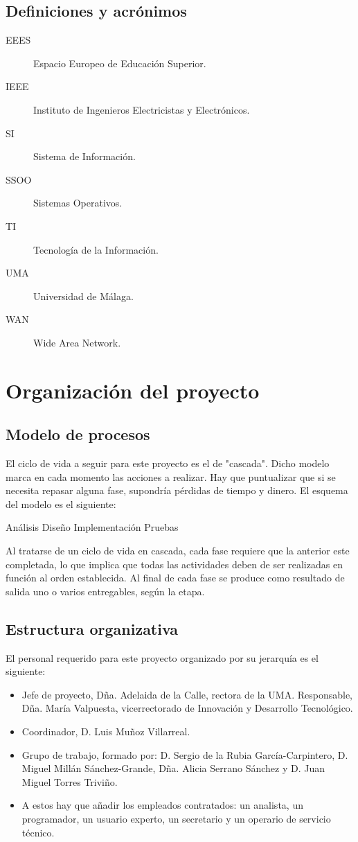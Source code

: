 \documentclass[11pt,a4paper,spanish,twoside]{report}
\begin{document}
\section{Definiciones y acrónimos}
\begin{description}
\item[EEES] Espacio Europeo de Educación Superior.
\item[IEEE] Instituto de Ingenieros Electricistas y Electrónicos.
\item[SI] Sistema de Información.
\item[SSOO] Sistemas Operativos.
\item[TI] Tecnología de la Información.
\item[UMA] Universidad de Málaga.
\item[WAN] Wide Area Network.
\end{description}

\chapter{Organización del proyecto}
\section{Modelo de procesos}
El ciclo de vida a seguir para este proyecto es el de "cascada". Dicho 
modelo marca en cada momento las acciones a realizar. Hay que puntualizar 
que si se necesita repasar alguna fase, supondría pérdidas de tiempo y dinero.
El esquema del modelo es el siguiente:

Análisis
    Diseño
        Implementación
            Pruebas

Al tratarse de un ciclo de vida en cascada, cada fase requiere que la anterior 
este completada, lo que implica que todas las actividades deben de ser 
realizadas en función al orden establecida. Al final de cada fase se produce 
como resultado de salida uno o varios entregables, según la etapa.

\section{Estructura organizativa}
El personal requerido para este proyecto organizado por su jerarquía es el 
siguiente:
\begin{itemize}
\item Jefe de proyecto, Dña. Adelaida de la Calle, rectora de la UMA.
  Responsable, Dña. María Valpuesta, vicerrectorado de Innovación y Desarrollo 
  Tecnológico.
\item Coordinador, D. Luis Muñoz Villarreal.
\item Grupo de trabajo, formado por: D. Sergio de la Rubia García-Carpintero, 
D. Miguel Millán Sánchez-Grande, Dña. Alicia Serrano Sánchez y D. Juan Miguel
Torres Triviño. 
\item A estos hay que añadir los empleados contratados: un analista, un 
  programador, un usuario experto, un secretario y un operario de servicio 
  técnico.
\end{itemize}
\end{document}
